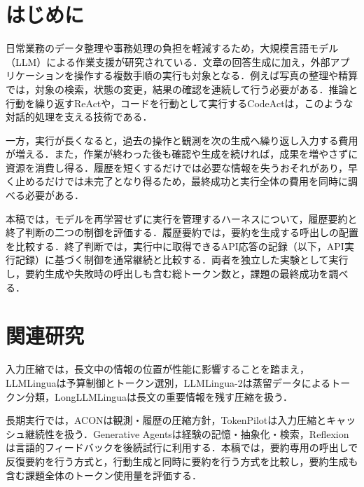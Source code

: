 \documentclass[letter]{ieicej}
\begin{document}
\maketitle



\section{はじめに}

日常業務のデータ整理や事務処理の負担を軽減するため，大規模言語モデル（LLM）による作業支援が研究されている．文章の回答生成に加え，外部アプリケーションを操作する複数手順の実行も対象となる．例えば写真の整理や精算では，対象の検索，状態の変更，結果の確認を連続して行う必要がある．推論と行動を繰り返すReAct\cite{yao2023react}や，コードを行動として実行するCodeAct\cite{wang2024codeact}は，このような対話的処理を支える技術である．

一方，実行が長くなると，過去の操作と観測を次の生成へ繰り返し入力する費用が増える．また，作業が終わった後も確認や生成を続ければ，成果を増やさずに資源を消費し得る．履歴を短くするだけでは必要な情報を失うおそれがあり，早く止めるだけでは未完了となり得るため，最終成功と実行全体の費用を同時に調べる必要がある．

本稿では，モデルを再学習せずに実行を管理するハーネスについて，履歴要約と終了判断の二つの制御を評価する．履歴要約では，要約を生成する呼出しの配置を比較する．終了判断では，実行中に取得できるAPI応答の記録（以下，API実行記録）に基づく制御を通常継続と比較する．両者を独立した実験として実行し，要約生成や失敗時の呼出しも含む総トークン数と，課題の最終成功を調べる．

\section{関連研究}

入力圧縮では，長文中の情報の位置が性能に影響すること\cite{liu2024lost}を踏まえ，LLMLingua\cite{jiang2023llmlingua}は予算制御とトークン選別，LLMLingua-2\cite{pan2024llmlingua2}は蒸留データによるトークン分類，LongLLMLingua\cite{jiang2024longllmlingua}は長文の重要情報を残す圧縮を扱う．

長期実行では，ACON\cite{kang2026acon}は観測・履歴の圧縮方針，TokenPilot\cite{xu2026tokenpilot}は入力圧縮とキャッシュ継続性を扱う．Generative Agents\cite{park2023generative}は経験の記憶・抽象化・検索，Reflexion\cite{shinn2023reflexion}は言語的フィードバックを後続試行に利用する．本稿では，要約専用の呼出しで反復要約を行う方式と，行動生成と同時に要約を行う方式を比較し，要約生成も含む課題全体のトークン使用量を評価する．
\end{document}
